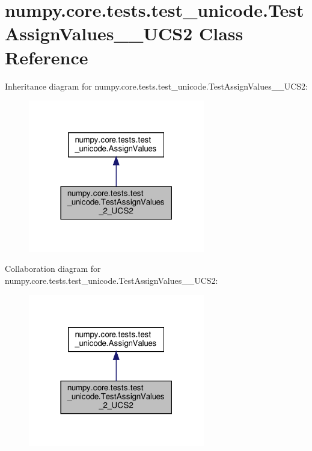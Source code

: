 \hypertarget{classnumpy_1_1core_1_1tests_1_1test__unicode_1_1TestAssignValues__2__UCS2}{}\section{numpy.\+core.\+tests.\+test\+\_\+unicode.\+Test\+Assign\+Values\+\_\+\_\+\+U\+C\+S2 Class Reference}
\label{classnumpy_1_1core_1_1tests_1_1test__unicode_1_1TestAssignValues__2__UCS2}


Inheritance diagram for numpy.\+core.\+tests.\+test\+\_\+unicode.\+Test\+Assign\+Values\+\_\+\_\+\+U\+C\+S2\+:
\nopagebreak
\begin{figure}[H]
\begin{center}
\leavevmode
\includegraphics[width=218pt]{classnumpy_1_1core_1_1tests_1_1test__unicode_1_1TestAssignValues__2__UCS2__inherit__graph}
\end{center}
\end{figure}


Collaboration diagram for numpy.\+core.\+tests.\+test\+\_\+unicode.\+Test\+Assign\+Values\+\_\+\_\+\+U\+C\+S2\+:
\nopagebreak
\begin{figure}[H]
\begin{center}
\leavevmode
\includegraphics[width=218pt]{classnumpy_1_1core_1_1tests_1_1test__unicode_1_1TestAssignValues__2__UCS2__coll__graph}
\end{center}
\end{figure}
